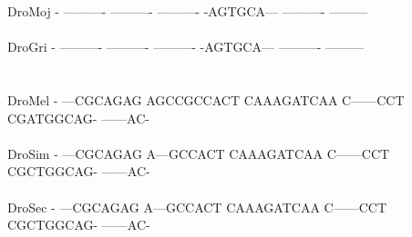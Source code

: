 \documentclass[11pt,twoside,reqno,a4paper]{article}
\begin{document}
{DroMoj	-	----------	----------	----------	-AGTGCA---	----------	---------\\
\hspace*{7\charwidth}\hspace*{1\charwidth}\hspace*{1\charwidth}\hspace*{1\charwidth}\hspace*{1\charwidth}\hspace*{1\charwidth}\hspace*{1\charwidth}\\
DroGri	-	----------	----------	----------	-AGTGCA---	----------	---------\\
\hspace*{7\charwidth}\hspace*{1\charwidth}\hspace*{1\charwidth}\hspace*{1\charwidth}\hspace*{1\charwidth}\hspace*{1\charwidth}\hspace*{1\charwidth}\\
\\
DroMel	-	---CGCAGAG	AGCCGCCACT	CAAAGATCAA	C------CCT	CGATGGCAG-	------AC-\\
\hspace*{7\charwidth}\hspace*{1\charwidth}\hspace*{1\charwidth}\hspace*{1\charwidth}\hspace*{1\charwidth}\hspace*{1\charwidth}\hspace*{1\charwidth}\\
DroSim	-	---CGCAGAG	A---GCCACT	CAAAGATCAA	C------CCT	CGCTGGCAG-	------AC-\\
\hspace*{7\charwidth}\hspace*{1\charwidth}\hspace*{1\charwidth}\hspace*{1\charwidth}\hspace*{1\charwidth}\hspace*{1\charwidth}\hspace*{1\charwidth}\\
DroSec	-	---CGCAGAG	A---GCCACT	CAAAGATCAA	C------CCT	CGCTGGCAG-	------AC-\\
\hspace*{7\charwidth}\hspace*{1\charwidth}\hspace*{1\charwidth}\hspace*{1\charwidth}\hspace*{1\charwidth}\hspace*{1\charwidth}\hspace*{1\charwidth}\\
}
\end{document}
